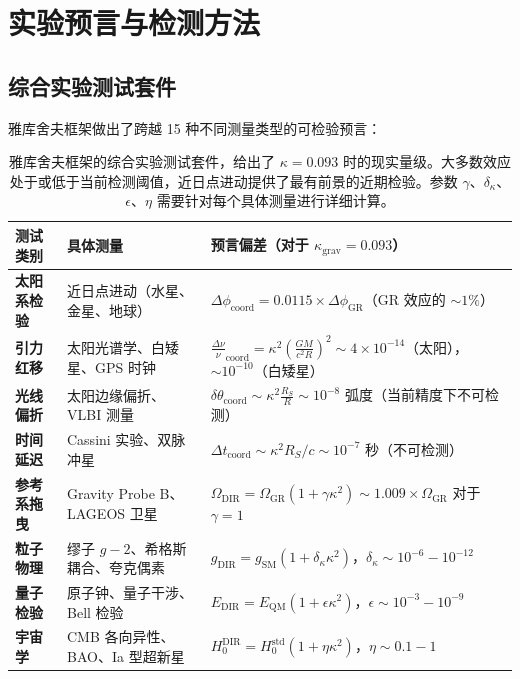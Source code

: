 \documentclass[11pt,a4paper]{article}
\begin{document}
	\section{实验预言与检测方法}
	\subsection{综合实验测试套件}
	
	雅库舍夫框架做出了跨越 15 种不同测量类型的可检验预言：
	
	\begin{table}[htbp]
		\centering
		\scriptsize
		\begin{tabular}{p{}p{}p{}}
			\toprule
			\textbf{测试类别} & \textbf{具体测量} & \textbf{预言偏差（对于 $\kappa_{\text{grav}} = 0.093$）} \\
			\midrule
			\textbf{太阳系检验} & 
			近日点进动（水星、金星、地球） &
			$\Delta\phi_{\text{coord}} = 0.0115 \times \Delta\phi_{\text{GR}}$（GR 效应的 $\sim 1\%$） \\
			\hline
			\textbf{引力红移} &
			太阳光谱学、白矮星、GPS 时钟 &
			$\frac{\Delta\nu}{\nu}_{\text{coord}} = \kappa^2\left(\frac{GM}{c^2R}\right)^2 \sim 4\times10^{-14}$（太阳），$\sim 10^{-10}$（白矮星） \\
			\hline
			\textbf{光线偏折} &
			太阳边缘偏折、VLBI 测量 &
			$\delta\theta_{\text{coord}} \sim \kappa^2 \frac{R_S}{R} \sim 10^{-8}$ 弧度（当前精度下不可检测） \\
			\hline
			\textbf{时间延迟} &
			Cassini 实验、双脉冲星 &
			$\Delta t_{\text{coord}} \sim \kappa^2 R_S/c \sim 10^{-7}$ 秒（不可检测） \\
			\hline
			\textbf{参考系拖曳} &
			Gravity Probe B、LAGEOS 卫星 &
			$\Omega_{\text{DIR}} = \Omega_{\text{GR}} (1 + \gamma \kappa^2) \sim 1.009 \times \Omega_{\text{GR}}$ 对于 $\gamma=1$ \\
			\hline
			\textbf{粒子物理} &
			缪子 $g-2$、希格斯耦合、夸克偶素 &
			$g_{\text{DIR}} = g_{\text{SM}} (1 + \delta_\kappa \kappa^2)$，$\delta_\kappa \sim 10^{-6} - 10^{-12}$ \\
			\hline
			\textbf{量子检验} &
			原子钟、量子干涉、Bell 检验 &
			$E_{\text{DIR}} = E_{\text{QM}} (1 + \epsilon \kappa^2)$，$\epsilon \sim 10^{-3} - 10^{-9}$ \\
			\hline
			\textbf{宇宙学} &
			CMB 各向异性、BAO、Ia 型超新星 &
			$H_0^{\text{DIR}} = H_0^{\text{std}} (1 + \eta \kappa^2)$，$\eta \sim 0.1 - 1$ \\
			\bottomrule
		\end{tabular}
		\caption{雅库舍夫框架的综合实验测试套件，给出了 $\kappa = 0.093$ 时的现实量级。大多数效应处于或低于当前检测阈值，近日点进动提供了最有前景的近期检验。参数 $\gamma$、$\delta_\kappa$、$\epsilon$、$\eta$ 需要针对每个具体测量进行详细计算。}
	\end{table}
	
\end{document}

